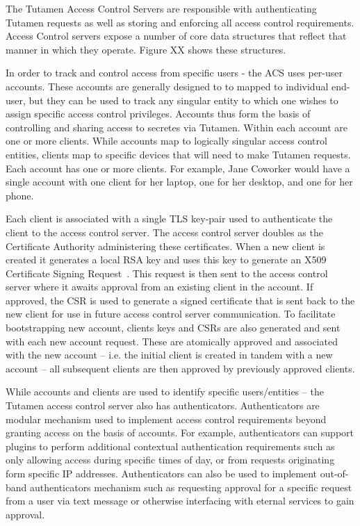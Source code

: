 The Tutamen Access Control Servers are responsible with authenticating
Tutamen requests as well as storing and enforcing all access control
requirements. Access Control servers expose a number of core data
structures that reflect that manner in which they operate. Figure XX
shows these structures.

In order to track and control access from specific users - the ACS
uses per-user accounts. These accounts are generally designed to to
mapped to individual end-user, but they can be used to track any
singular entity to which one wishes to assign specific access control
privileges. Accounts thus form the basis of controlling and sharing
access to secretes via Tutamen. Within each account are one or more
clients. While accounts map to logically singular access control
entities, clients map to specific devices that will need to make
Tutamen requests. Each account has one or more clients. For example,
Jane Coworker would have a single account with one client for her
laptop, one for her desktop, and one for her phone.

Each client is associated with a single TLS key-pair used to
authenticate the client to the access control server. The access
control server doubles as the Certificate Authority administering
these certificates. When a new client is created it generates a local
RSA key and uses this key to generate an X509 Certificate Signing
Request~\cite{rfc5280}. This request is then sent to the access
control server where it awaits approval from an existing client in the
account. If approved, the CSR is used to generate a signed certificate
that is sent back to the new client for use in future access control
server communication. To facilitate bootstrapping new account, clients
keys and CSRs are also generated and sent with each new account
request. These are atomically approved and associated with the new
account -- i.e. the initial client is created in tandem with a new
account -- all subsequent clients are then approved by previously
approved clients.

While accounts and clients are used to identify specific
users/entities -- the Tutamen access control server also has
authenticators. Authenticators are modular mechanism used to implement
access control requirements beyond granting access on the basis of
accounts. For example, authenticators can support plugins to perform
additional contextual authentication requirements such as only
allowing access during specific times of day, or from requests
originating form specific IP addresses. Authenticators can also be
used to implement out-of-band authenticators mechanism such as
requesting approval for a specific request from a user via text
message or otherwise interfacing with eternal services to gain
approval.

